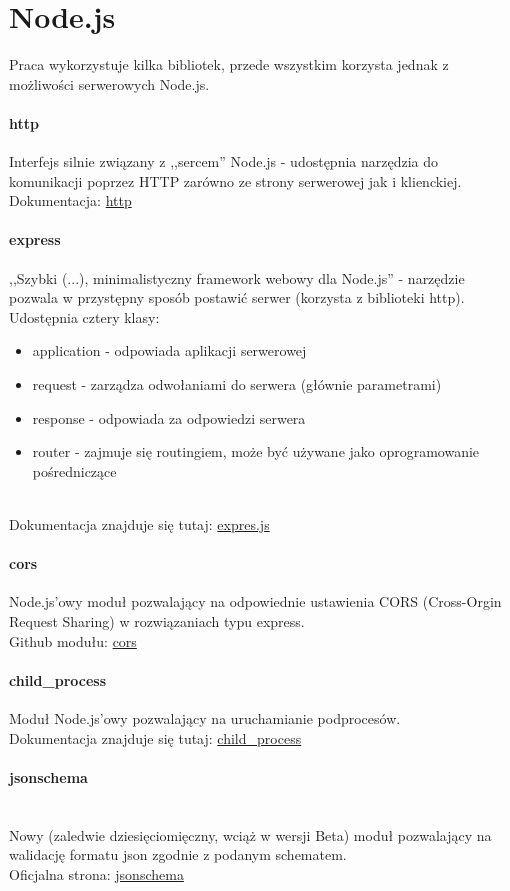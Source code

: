 \section{Node.js}
Praca wykorzystuje kilka bibliotek, przede wszystkim korzysta jednak z możliwości serwerowych Node.js. 
\paragraph{http}
Interfejs silnie związany z ,,sercem'' Node.js - udostępnia narzędzia do komunikacji poprzez HTTP zarówno ze strony serwerowej jak i klienckiej.
\newline Dokumentacja: \href{https://nodejs.org/api/http.html}{http}
\paragraph{express}
,,Szybki (...), minimalistyczny framework webowy dla Node.js'' - narzędzie pozwala w przystępny sposób postawić serwer (korzysta z biblioteki http). Udostępnia cztery klasy:
\begin{itemize}
\item application - odpowiada aplikacji serwerowej
\item  request - zarządza odwołaniami do serwera (głównie parametrami)
\item response - odpowiada za odpowiedzi serwera
\item router - zajmuje się routingiem, może być używane jako oprogramowanie pośredniczące
\end{itemize}
\\Dokumentacja znajduje się tutaj: \href{https://expressjs.com/}{expres.js}
\paragraph{cors}
Node.js'owy moduł pozwalający na odpowiednie ustawienia CORS (Cross-Orgin Request Sharing) w rozwiązaniach typu express.
\\Github modułu: \href{https://github.com/expressjs/cors}{cors}
\paragraph{child\_process}
Moduł Node.js'owy pozwalający na uruchamianie podprocesów.
\\Dokumentacja znajduje się tutaj: \href{https://nodejs.org/api/child_process.html}{child\_process}
\paragraph{jsonschema}
\\Nowy (zaledwie dziesięciomięczny, wciąż w wersji Beta) moduł pozwalający na walidację formatu json zgodnie z podanym schematem.
\\Oficjalna strona: \href{https://www.npmjs.com/package/jsonschema}{jsonschema}

